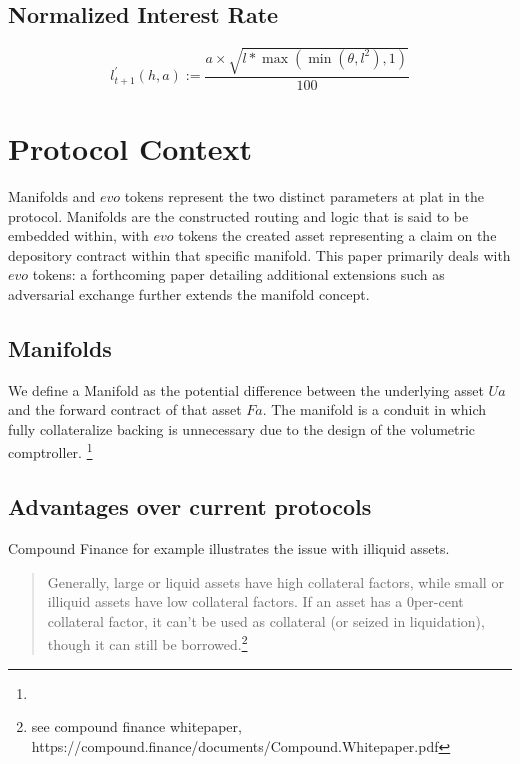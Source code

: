 \begin{tcolorbox}
\subsection{Normalized Interest Rate}
\label{Normalized Interest Rate }
\begin{equation}
l_{t+1}^{\prime}(h, a):=\frac{a \times \sqrt{l * \max \left(\min \left(\theta, l^{2}\right), 1\right)}}{100}
\end{equation}
\end{tcolorbox}



\newpage


\section{Protocol Context}

Manifolds and $evo$ tokens represent the two distinct parameters at plat in the protocol. Manifolds are the constructed routing and logic that is said to be embedded  within, with $evo$ tokens the created asset representing a claim on the depository contract within that specific manifold. 
This paper primarily deals with $evo$ tokens: a forthcoming paper detailing additional extensions such as adversarial exchange further extends the manifold concept.


\subsection{Manifolds}
We define a Manifold as the  potential difference between the underlying asset $Ua$ and the forward contract of that asset $Fa$. The manifold is a conduit in which fully collateralize backing is unnecessary due to the design of the volumetric comptroller. \footnote{}

\subsection{Advantages over current protocols}

Compound Finance for example illustrates the issue with {illiquid assets}. 

\begin{quote}
    Generally, large or liquid assets have high collateral factors, while small or illiquid assets have low collateral factors. If an asset has a 0per-cent collateral factor, it can't be used as collateral (or seized in liquidation), though it can still be borrowed.\footnote{see compound finance whitepaper, https://compound.finance/documents/Compound.Whitepaper.pdf}
\end{quote}


